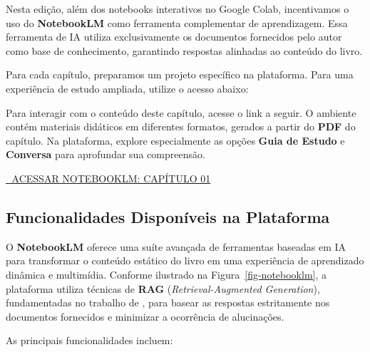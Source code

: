 \documentclass[
  portuguese,
  letterpaper,
  openany,
  oneside,
  12pt,
  a4paper]{book}
\begin{document}
Nesta edição, além dos notebooks interativos no Google Colab,
incentivamos o uso do \textbf{NotebookLM} como ferramenta complementar
de aprendizagem. Essa ferramenta de IA utiliza exclusivamente os
documentos fornecidos pelo autor como base de conhecimento, garantindo
respostas alinhadas ao conteúdo do livro.

Para cada capítulo, preparamos um projeto específico na plataforma. Para
uma experiência de estudo ampliada, utilize o acesso abaixo:

\begin{tcolorbox}[enhanced jigsaw, colframe=quarto-callout-important-color-frame, opacitybacktitle=0.6, coltitle=black, rightrule=.15mm, bottomrule=.15mm, arc=.35mm, toprule=.15mm, breakable, opacityback=0, colbacktitle=quarto-callout-important-color!10!white, left=2mm, title={🎓 Estude com o Tutor Inteligente}, bottomtitle=1mm, toptitle=1mm, titlerule=0mm, leftrule=.75mm, colback=white]

Para interagir com o conteúdo deste capítulo, acesse o link a seguir. O
ambiente contém materiais didáticos em diferentes formatos, gerados a
partir do \textbf{PDF} do capítulo. Na plataforma, explore especialmente
as opções \textbf{Guia de Estudo} e \textbf{Conversa} para aprofundar
sua compreensão.

\href{https://notebooklm.google.com/notebook/aca1138a-02aa-4f98-b777-1e25795ca635}{🚀
ACESSAR NOTEBOOKLM: CAPÍTULO 01}

\end{tcolorbox}

\subsection*{Funcionalidades Disponíveis na
Plataforma}\label{funcionalidades-disponuxedveis-na-plataforma}

O \textbf{NotebookLM} oferece uma suíte avançada de ferramentas baseadas
em IA para transformar o conteúdo estático do livro em uma experiência
de aprendizado dinâmica e multimídia. Conforme ilustrado na
Figura~\ref{fig-notebooklm}, a plataforma utiliza técnicas de
\textbf{RAG} (\emph{Retrieval-Augmented Generation}), fundamentadas no
trabalho de \textcite{lewis2020retrieval}, para basear as respostas
estritamente nos documentos fornecidos e minimizar a ocorrência de
alucinações.

As principais funcionalidades incluem:
\end{document}
